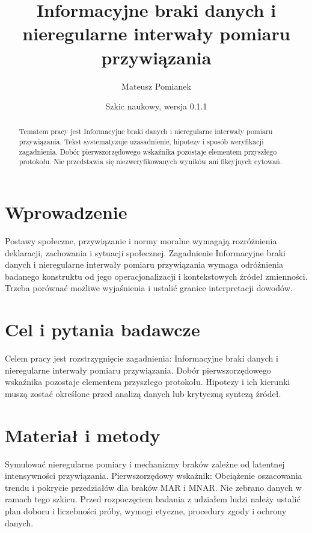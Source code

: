 \documentclass[11pt,a4paper]{article}
\title{Informacyjne braki danych i nieregularne interwały pomiaru przywiązania}
\author{Mateusz Pomianek}
\date{Szkic naukowy, wersja 0.1.1}
\begin{document}
\maketitle

\begin{abstract}

Tematem pracy jest Informacyjne braki danych i nieregularne interwały pomiaru przywiązania. Tekst systematyzuje uzasadnienie, hipotezy i sposób weryfikacji zagadnienia. Dobór pierwszorzędowego wskaźnika pozostaje elementem przyszłego protokołu. Nie przedstawia się niezweryfikowanych wyników ani fikcyjnych cytowań.

\end{abstract}

\section{Wprowadzenie}

Postawy społeczne, przywiązanie i normy moralne wymagają rozróżnienia deklaracji, zachowania i sytuacji społecznej. Zagadnienie Informacyjne braki danych i nieregularne interwały pomiaru przywiązania wymaga odróżnienia badanego konstruktu od jego operacjonalizacji i kontekstowych źródeł zmienności. Trzeba porównać możliwe wyjaśnienia i ustalić granice interpretacji dowodów.

\section{Cel i pytania badawcze}

Celem pracy jest rozstrzygnięcie zagadnienia: Informacyjne braki danych i nieregularne interwały pomiaru przywiązania. Dobór pierwszorzędowego wskaźnika pozostaje elementem przyszłego protokołu. Hipotezy i ich kierunki muszą zostać określone przed analizą danych lub krytyczną syntezą źródeł.

\section{Materiał i metody}

Symulować nieregularne pomiary i mechanizmy braków zależne od latentnej intensywności przywiązania. Pierwszorzędowy wskaźnik: Obciążenie oszacowania trendu i pokrycie przedziałów dla braków MAR i MNAR. Nie zebrano danych w ramach tego szkicu. Przed rozpoczęciem badania z udziałem ludzi należy ustalić plan doboru i liczebności próby, wymogi etyczne, procedury zgody i ochrony danych.
\end{document}
